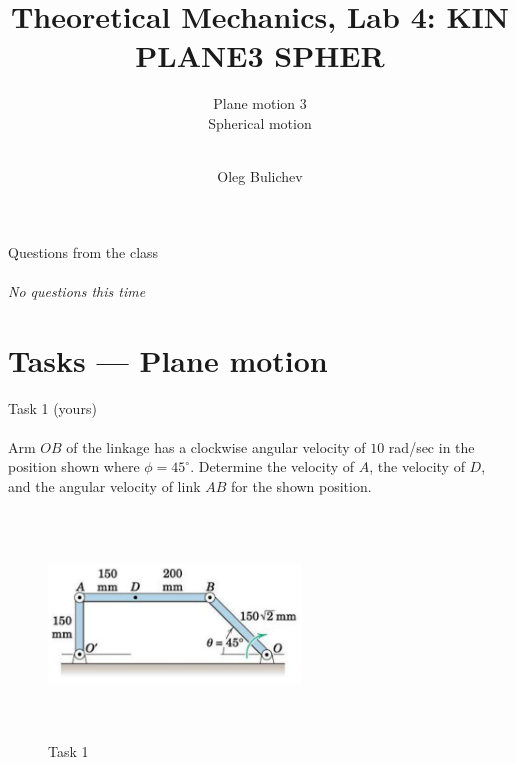 \documentclass[aspectratio=169]{beamer}
\title[Theoretical Mechanics]{Theoretical Mechanics, Lab 4: KIN PLANE3 SPHER} %
\subtitle{ Plane motion 3 \\
Spherical motion \\ \ 
         } %
\author{Oleg Bulichev}
\newcommand{\fbckg}[1]{\usebackgroundtemplate{\texttt{[image: \#1]}}}%
\begin{document}
\setlength{\abovedisplayskip}{0pt}
\setlength{\belowdisplayskip}{0pt}
\setlength{\abovedisplayshortskip}{0pt}
\setlength{\belowdisplayshortskip}{0pt}

\fbckg{fibeamer/figs/title_page.png}

\fbckg{fibeamer/figs/common.png}

\begin{frame}[t]{Questions from the class}
\framesubtitle{}
\vfill
\begin{center}
    \emph{No questions this time}
\end{center}
\vfill
\end{frame}

\section*{Tasks --- Plane motion}

\begin{frame}[t]{Task 1 (yours)}
\framesubtitle{}
\vspace*{-0.4cm}
Arm $OB$ of the linkage has a clockwise angular velocity of $10$ rad/sec in the position shown where $\phi = 45^\circ$. Determine the velocity of $A$, the velocity of $D$, and the angular velocity of link $AB$ for the shown position.
    \begin{figure}[H]
        \centering\includegraphics[height=6cm,width=0.6\textwidth,keepaspectratio]{image24.png}
        \caption*{Task 1}
        \label{fig:image24}
    \end{figure}
\end{frame}
\end{document}
